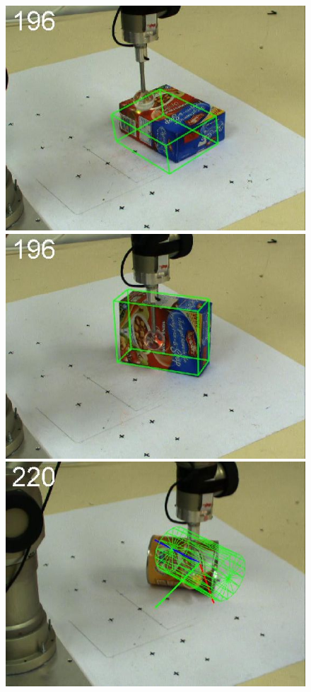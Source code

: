 \begin{figure}[htbp]
{\includegraphics[width=\imgAXwid]{./A2_LWPR1_399_4}
\includegraphics[width=\imgAXwid]{./A2_2exp_87_4}
\includegraphics[width=\imgAXwid]{./A3_2exp_39_4}
}
\end{figure}
